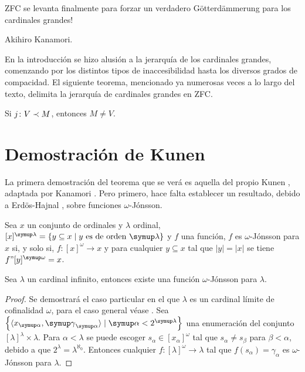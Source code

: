 \documentclass
[
  12pt,
  letterpaper,
  openany,
  oneside,
]{book}
\begin{document}
\epigraph
{
    ZFC se levanta finalmente para forzar
    un verdadero Götterdämmerung para los cardinales
    grandes!
}
{Akihiro Kanamori. \autocite[324]{kanamori_higher_2009}}


En la introducción se hizo alusión a la jerarquía de los cardinales grandes,
comenzando por los distintos tipos de inaccesibilidad hasta los diversos
grados de compacidad. El siguiente teorema, mencionado ya numerosas veces a lo largo
del texto, delimita la jerarquía de cardinales grandes en ZFC.

\begin{teo}\label{teo:kunen}
    Si $j\colon V\prec M$, entonces $M\neq V$.
\end{teo}

\section{Demostración de Kunen}

La primera demostración del teorema que se verá es aquella
del propio Kunen \autocite{kunen_elementary_1971}, adaptada
por Kanamori \autocite{kanamori_higher_2009}. Pero primero,
hace falta establecer un resultado, debido a Erdös-Hajnal \autocite{erdos_problem_1966},
sobre funciones $\omega$-Jónsson.

\begin{defi}
    Sea $x$ un conjunto de ordinales y $\lambda$ ordinal, $[x]^\lambda = \set{y\subseteq x\mid \text{$y$ es de orden $\lambda$}}$
    y $f$ una función,
    $f$ es $\omega$-Jónsson para $x$ si, y solo si,
    $f\colon [x]^\omega\to x$ y para cualquier $y\subseteq x$
    tal que $|y|=|x|$ se tiene $f"[y]^\omega = x$.
\end{defi}

\begin{teo}\label{teo:jonsson}
    Sea $\lambda$ un cardinal infinito, entonces existe una función $\omega$-Jónsson para $\lambda$.
\end{teo}

\begin{proof}
    Se demostrará el caso particular en el que $\lambda$
    es un cardinal límite de cofinalidad $\omega$,
    para el caso general véase \autocite[Teorema 23.13]{kanamori_higher_2009}.
    Sea $\set{\op{x_\alpha,\gamma_\alpha}\mid \alpha < 2^\lambda}$
    una enumeración del conjunto $[\lambda]^\lambda\times\lambda$.
    Para $\alpha<\lambda$ se puede escoger $s_\alpha\in[x_\alpha]^\omega$
    tal que $s_\alpha\neq s_\beta$ para $\beta<\alpha$,
    debido a que $2^\lambda=\lambda^{\aleph_0}$. Entonces cualquier
    $f\colon[\lambda]^\omega\to\lambda$ tal que $f(s_\alpha)=\gamma_\alpha$
    es $\omega$-Jónsson para $\lambda$.
\end{proof}
\end{document}
